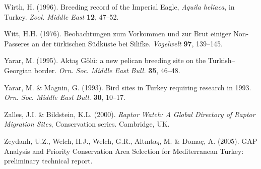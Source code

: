\documentclass[
  a4paper,
  DIV=11,
  numbers=noendperiod]{scrreprt}
\newlength{\cslhangindent}
\newenvironment{CSLReferences}[2] %
 {\begin{list}{}{%
  \setlength{\itemindent}{0pt}
  \setlength{\leftmargin}{0pt}
  \setlength{\parsep}{0pt}
  \ifodd #1
   \setlength{\leftmargin}{\cslhangindent}
   \setlength{\itemindent}{-1\cslhangindent}
  \fi
  \setlength{\itemsep}{#2\baselineskip}}}
 {\end{list}}
\begin{document}
\begin{CSLReferences}{1}{1}
Wirth, H. (1996). {Breeding record of the Imperial Eagle, \emph{Aquila
heliaca}, in Turkey}. \emph{Zool. Middle East} \textbf{12}, 47--52.

Witt, H.H. (1976). {Beobachtungen zum Vorkommen und zur Brut einiger
Non-Passeres an der türkischen Südküste bei Silifke}. \emph{Vogelwelt}
\textbf{97}, 139--145.

Yarar, M. (1995). {Aktaş Gölü: a new pelican breeding site on the
Turkish--Georgian border}. \emph{Orn. Soc. Middle East Bull.}
\textbf{35}, 46--48.

Yarar, M. \& Magnin, G. (1993). {Bird sites in Turkey requiring research
in 1993}. \emph{Orn. Soc. Middle East Bull.} \textbf{30}, 10--17.

Zalles, J.I. \& Bildstein, K.L. (2000). \emph{{Raptor Watch: A Global
Directory of Raptor Migration Sites}}, Conservation series. Cambridge,
UK.

Zeydanlı, U.Z., Welch, H.J., Welch, G.R., Altıntaş, M. \& Domaç, A.
(2005). {GAP Analysis and Priority Conservation Area Selection for
Mediterranean Turkey: preliminary technical report}.

\end{CSLReferences}
\end{document}
